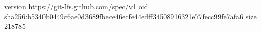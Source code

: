 version https://git-lfs.github.com/spec/v1
oid sha256:b5340b0449c6ae0d3689fbece46ecfe44edff34508916321e77fecc99fe7afa6
size 218785

